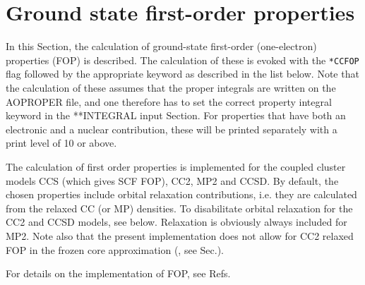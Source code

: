 \section{Ground state first-order properties}\label{sec:ccfop}

In this Section, the calculation of ground-state first-order
(one-electron) properties (FOP) is described. The calculation of these
is evoked with the \verb+*CCFOP+ flag followed by the appropriate
keyword as described in the list below. Note that the calculation
of these assumes that the proper integrals are written on the
AOPROPER file, and one therefore has to set the correct property
integral keyword in the **INTEGRAL input Section. For properties
that have both an electronic and a nuclear contribution, these will
be printed separately with a print level of 10 or above.

The calculation of first order properties is implemented for the 
coupled cluster models CCS (which gives SCF FOP),
CC2, MP2 and CCSD.  
By default, the chosen properties include orbital relaxation contributions,
i.e. they are calculated from the relaxed CC (or MP) densities. 
To disabilitate orbital relaxation for the CC2 and CCSD models, 
see  below. Relaxation is obviously always included for MP2. 
Note also that the present implementation does not allow for CC2 relaxed FOP
in the frozen core approximation (, see Sec.).

For details on the implementation of FOP, see 
Refs.~\cite{Halkier:CCFOP,HalCor:CC2FOP}

